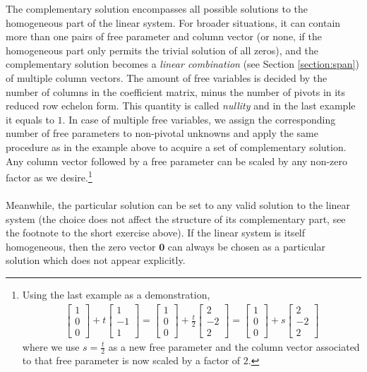 The complementary solution encompasses all possible solutions to the homogeneous part of the linear system. For broader situations, it can contain more than one pairs of free parameter and column vector (or none, if the homogeneous part only permits the trivial solution of all zeros), and the complementary solution becomes a \textit{linear combination} (see Section \ref{section:span}) of multiple column vectors. The amount of free variables is decided by the number of columns in the coefficient matrix, minus the number of pivots in its reduced row echelon form. This quantity is called \textit{nullity} and in the last example it equals to $1$. In case of multiple free variables, we assign the corresponding number of free parameters to non-pivotal unknowns and apply the same procedure as in the example above to acquire a set of complementary solution. Any column vector followed by a free parameter can be scaled by any non-zero factor as we desire.\footnote{Using the last example as a demonstration, 
\begin{align*}
\begin{bmatrix}
1 \\
0 \\
0
\end{bmatrix}
+ t
\begin{bmatrix}
1 \\
-1 \\
1
\end{bmatrix}
=
\begin{bmatrix}
1 \\
0 \\
0
\end{bmatrix}
+ \frac{t}{2}
\begin{bmatrix}
2 \\
-2 \\
2
\end{bmatrix}
=
\begin{bmatrix}
1 \\
0 \\
0
\end{bmatrix}
+ s
\begin{bmatrix}
2 \\
-2 \\
2
\end{bmatrix}
\end{align*} where we use $s = \frac{t}{2}$ as a new free parameter and the column vector associated to that free parameter is now scaled by a factor of $2$.} \\
\\
Meanwhile, the particular solution can be set to any valid solution to the linear system (the choice does not affect the structure of its complementary part, see the footnote to the short exercise above). If the linear system is itself homogeneous, then the zero vector $\textbf{0}$ can always be chosen as a particular solution which does not appear explicitly.\\
